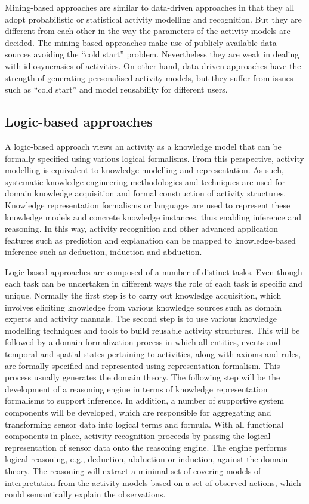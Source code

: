 Mining-based approaches are similar to data-driven approaches in that they all adopt probabilistic or statistical activity modelling and recognition. But they are different from each other in the way the parameters of the activity models are decided. The mining-based approaches make use of publicly available data sources avoiding the “cold start” problem. Nevertheless they are weak in dealing with idiosyncrasies of activities. On other hand, data-driven approaches have the strength of generating personalised activity models, but they suffer from issues such as “cold start” and model reusability for different users.

\subsection{Logic-based approaches}

A logic-based approach views an activity as a knowledge model that can be formally specified using various logical formalisms. From this perspective, activity modelling is equivalent to knowledge modelling and representation. As such, systematic knowledge engineering methodologies and techniques are used for domain knowledge acquisition and formal construction of activity structures. Knowledge representation formalisms or languages are used to represent these knowledge models and concrete knowledge instances, thus enabling inference and reasoning. In this way, activity recognition and other advanced application features such as prediction and explanation can be mapped to knowledge-based inference such as deduction, induction and abduction. 

Logic-based approaches are composed of a number of distinct tasks. Even though each task can be undertaken in different ways the role of each task is specific and unique. Normally the first step is to carry out knowledge acquisition, which involves eliciting knowledge from various knowledge sources such as domain experts and activity manuals. The second step is to use various knowledge modelling techniques and tools to build reusable activity structures. This will be followed by a domain formalization process in which all entities, events and temporal and spatial states pertaining to activities, along with axioms and rules, are formally specified and represented using representation formalism. This process usually generates the domain theory. The following step will be the development of a reasoning engine in terms of knowledge representation formalisms to support inference. In addition, a number of supportive system components will be developed, which are responsible for aggregating and transforming sensor data into logical terms and formula. With all functional components in place, activity recognition proceeds by passing the logical representation of sensor data onto the reasoning engine. The engine performs logical reasoning, e.g., deduction, abduction or induction, against the domain theory. The reasoning will extract a minimal set of covering models of interpretation from the activity models based on a set of observed actions, which could semantically explain the observations.

